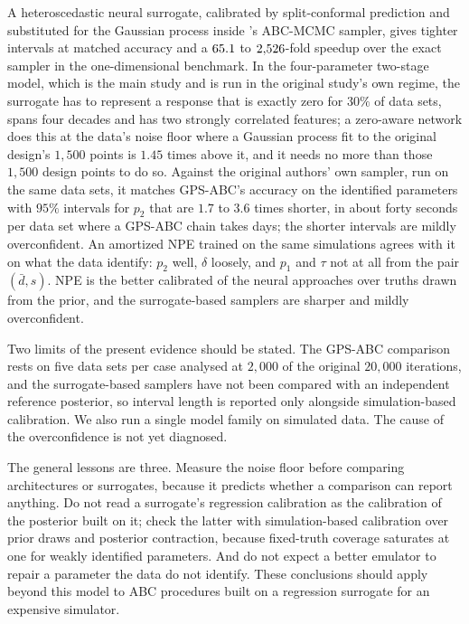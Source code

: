 \documentclass[sn-basic,iicol,pdflatex]{sn-jnl}
\begin{document}
A heteroscedastic neural surrogate, calibrated by split-conformal prediction and substituted for the Gaussian process inside
\citeauthor{lu2023}'s ABC-MCMC sampler, gives tighter intervals at matched accuracy and a $65.1$ to $2{,}526$-fold speedup over
the exact sampler in the one-dimensional benchmark. In the four-parameter two-stage model, which is the main study and is run in the
original study's own regime, the surrogate has to represent a response that is exactly zero for $30\%$ of data sets, spans four
decades and has two strongly correlated features; a zero-aware network does this at the data's noise floor where a Gaussian
process fit to the original design's $1{,}500$ points is $1.45$ times above it, and it needs no more than those $1{,}500$ design points to do so. Against the original authors' own sampler, run on the same data sets, it matches GPS-ABC's accuracy on the identified parameters with $95\%$ intervals for $p_2$ that are $1.7$ to $3.6$ times shorter, in about forty seconds per data set where a GPS-ABC chain takes days; the shorter intervals are mildly overconfident.
An amortized NPE trained on the same simulations agrees with it on what the data identify: $p_2$ well, $\delta$ loosely, and $p_1$ and $\tau$ not at all
from the pair $(\bar d,s)$. NPE is the better calibrated of the neural approaches over truths drawn from the prior, and the
surrogate-based samplers are sharper and mildly overconfident.

Two limits of the present evidence should be stated. The GPS-ABC comparison rests on five data sets per case analysed at $2{,}000$ of the original $20{,}000$ iterations, and the surrogate-based samplers have not been compared with an independent reference posterior, so interval length is reported only alongside simulation-based calibration. We also run a single model family on simulated data. The cause of the overconfidence is not yet diagnosed.

The general lessons are three. Measure the noise floor before comparing architectures or surrogates, because it predicts whether
a comparison can report anything. Do not read a surrogate's regression calibration as the calibration of the posterior built on it;
check the latter with simulation-based calibration over prior draws and posterior contraction, because fixed-truth coverage
saturates at one for weakly identified parameters. And do not expect a better emulator to repair a parameter the data do not identify. These
conclusions should apply beyond this model to ABC procedures built on a regression surrogate for an expensive simulator.
\end{document}
